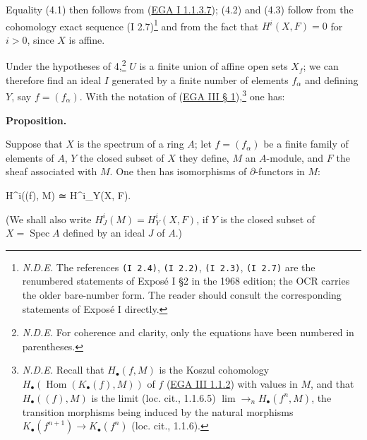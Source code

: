 \documentclass[
  11pt,
  a4paper,
]{book}
\newenvironment{Shaded}{}{}
\newcommand{\NormalTok}[1]{#1}
\begin{document}
Equality (4.1) then follows from
(\href{https://jcreinhold.github.io/ega/i/01-01-affine-schemes.html\#11-the-prime-spectrum-of-a-ring}{EGA
I 1.1.3.7}); (4.2) and (4.3) follow from the cohomology exact sequence
(I 2.7)\footnote{\emph{N.D.E.} The references \texttt{(I\ 2.4)},
  \texttt{(I\ 2.2)}, \texttt{(I\ 2.3)}, \texttt{(I\ 2.7)} are the
  renumbered statements of Exposé I §2 in the 1968 edition; the OCR
  carries the older bare-number form. The reader should consult the
  corresponding statements of Exposé I directly.} and from the fact that
\(H^{i}(X, F) = 0\) for \(i > 0\), since \(X\) is affine.

Under the hypotheses of 4,\footnote{\emph{N.D.E.} For coherence and
  clarity, only the equations have been numbered in parentheses.} \(U\)
is a finite union of affine open sets \(X_{f}\); we can therefore find
an ideal \(I\) generated by a finite number of elements \(f_{\alpha}\)
and defining \(Y\), say \(f = (f_{\alpha})\). With the notation of
(\href{https://jcreinhold.github.io/ega/iii/08-ch3-01-cohomology-affine-schemes.html\#1-cohomology-of-affine-schemes}{EGA
III § 1}),\footnote{\emph{N.D.E.} Recall that \(H_{\bullet}(f, M)\) is
  the Koszul cohomology
  \(H_{\bullet}(\operatorname{Hom}(K_{\bullet}(f), M))\) of \(f\)
  (\href{https://jcreinhold.github.io/ega/iii/08-ch3-01-cohomology-affine-schemes.html\#11-review-of-the-exterior-algebra-complex}{EGA
  III 1.1.2}) with values in \(M\), and that \(H_{\bullet}((f), M)\) is
  the limit (loc. cit., 1.1.6.5) \(\lim\to_{n} H_{\bullet}(f^{n}, M)\),
  the transition morphisms being induced by the natural morphisms
  \(K_{\bullet}(f^{n+1}) \to K_{\bullet}(f^{n})\) (loc. cit., 1.1.6).}
one has:

\textbf{Proposition.}

Suppose that \(X\) is the spectrum of a ring \(A\); let
\(f = (f_{\alpha})\) be a finite family of elements of \(A\), \(Y\) the
closed subset of \(X\) they define, \(M\) an \(A\)-module, and \(F\) the
sheaf associated with \(M\). One then has isomorphisms of
\(\partial\)-functors in \(M\):

\begin{Shaded}
\begin{Highlighting}[]
\NormalTok{H\^{}i((f), M) ≃ H\^{}i\_Y(X, F).}
\end{Highlighting}
\end{Shaded}

(We shall also write \(H^{i}_{J}(M) = H^{i}_{Y}(X, F)\), if \(Y\) is the
closed subset of \(X = \operatorname{Spec} A\) defined by an ideal \(J\)
of \(A\).)
\end{document}
